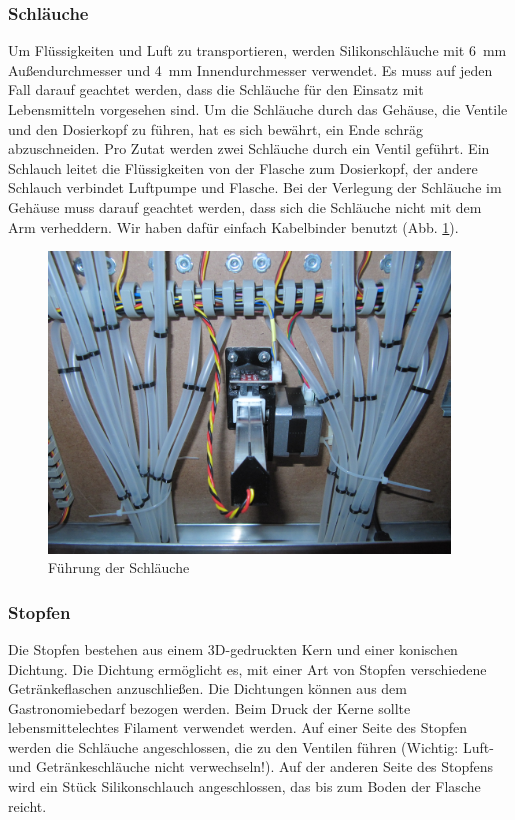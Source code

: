 \documentclass[a4paper]{scrartcl}
\begin{document}
\subsubsection{Schläuche}
Um Flüssigkeiten und Luft zu transportieren, werden Silikonschläuche mit \SI{6}{\milli\metre} Außendurchmesser und \SI{4}{\milli\metre} Innendurchmesser verwendet. Es muss auf jeden Fall darauf geachtet werden, dass die Schläuche für den Einsatz mit Lebensmitteln vorgesehen sind. Um die Schläuche durch das Gehäuse, die Ventile und den Dosierkopf zu führen, hat es sich bewährt, ein Ende schräg abzuschneiden.
Pro Zutat werden zwei Schläuche durch ein Ventil geführt. Ein Schlauch leitet die Flüssigkeiten von der Flasche zum Dosierkopf, der andere Schlauch verbindet Luftpumpe und Flasche. Bei der Verlegung der Schläuche im Gehäuse muss darauf geachtet werden, dass sich die Schläuche nicht mit dem Arm verheddern. Wir haben dafür einfach Kabelbinder benutzt (Abb. \ref{hoses}).

\begin{figure}
  \centering
  \includegraphics[height=8cm]{pics/hoses.JPG}
  \caption{Führung der Schläuche} \label{hoses}
\end{figure}

\subsubsection{Stopfen}
Die Stopfen bestehen aus einem 3D-gedruckten Kern und einer konischen Dichtung. Die Dichtung ermöglicht es, mit einer Art von Stopfen verschiedene Getränkeflaschen anzuschließen. Die Dichtungen können aus dem Gastronomiebedarf bezogen werden. Beim Druck der Kerne sollte lebensmittelechtes Filament verwendet werden. Auf einer Seite des Stopfen werden die Schläuche angeschlossen, die zu den Ventilen führen (Wichtig: Luft- und Getränkeschläuche nicht verwechseln!). Auf der anderen Seite des Stopfens wird ein Stück Silikonschlauch angeschlossen, das bis zum Boden der Flasche reicht.
\end{document}
